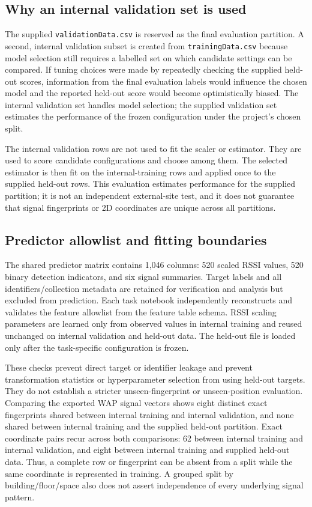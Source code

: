 \documentclass[conference]{IEEEtran}
\begin{document}
\subsection{Why an internal validation set is used}
The supplied \texttt{validationData.csv} is reserved as the final evaluation partition. A second, internal validation subset is created from \texttt{trainingData.csv} because model selection still requires a labelled set on which candidate settings can be compared. If tuning choices were made by repeatedly checking the supplied held-out scores, information from the final evaluation labels would influence the chosen model and the reported held-out score would become optimistically biased. The internal validation set handles model selection; the supplied validation set estimates the performance of the frozen configuration under the project's chosen split.

The internal validation rows are not used to fit the scaler or estimator. They are used to score candidate configurations and choose among them. The selected estimator is then fit on the internal-training rows and applied once to the supplied held-out rows. This evaluation estimates performance for the supplied partition; it is not an independent external-site test, and it does not guarantee that signal fingerprints or 2D coordinates are unique across all partitions.

\subsection{Predictor allowlist and fitting boundaries}
The shared predictor matrix contains 1,046 columns: 520 scaled RSSI values, 520 binary detection indicators, and six signal summaries. Target labels and all identifiers/collection metadata are retained for verification and analysis but excluded from prediction. Each task notebook independently reconstructs and validates the feature allowlist from the feature table schema. RSSI scaling parameters are learned only from observed values in internal training and reused unchanged on internal validation and held-out data. The held-out file is loaded only after the task-specific configuration is frozen.

These checks prevent direct target or identifier leakage and prevent transformation statistics or hyperparameter selection from using held-out targets. They do not establish a stricter unseen-fingerprint or unseen-position evaluation. Comparing the exported WAP signal vectors shows eight distinct exact fingerprints shared between internal training and internal validation, and none shared between internal training and the supplied held-out partition. Exact coordinate pairs recur across both comparisons: 62 between internal training and internal validation, and eight between internal training and supplied held-out data. Thus, a complete row or fingerprint can be absent from a split while the same coordinate is represented in training. A grouped split by building/floor/space also does not assert independence of every underlying signal pattern.
\end{document}
